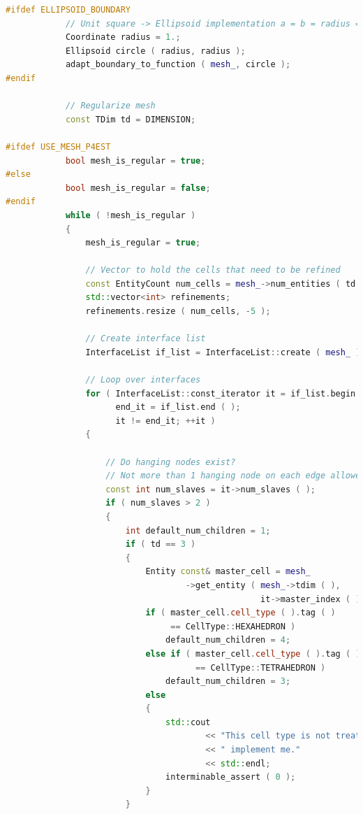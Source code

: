 \documentclass[a4paper, 11pt, twoside]{article}
\begin{document}
\begin{lstlisting}[language=C++, basicstyle={\footnotesize, \ttfamily}, keywordstyle=\color{blue}, numbers=none, tabsize=4]
#ifdef ELLIPSOID_BOUNDARY
            // Unit square -> Ellipsoid implementation a = b = radius = 1.
            Coordinate radius = 1.;
            Ellipsoid circle ( radius, radius );
            adapt_boundary_to_function ( mesh_, circle );
#endif

            // Regularize mesh
            const TDim td = DIMENSION;

#ifdef USE_MESH_P4EST
            bool mesh_is_regular = true;
#else
            bool mesh_is_regular = false;
#endif
            while ( !mesh_is_regular )
            {
                mesh_is_regular = true;

                // Vector to hold the cells that need to be refined
                const EntityCount num_cells = mesh_->num_entities ( td );
                std::vector<int> refinements;
                refinements.resize ( num_cells, -5 );

                // Create interface list
                InterfaceList if_list = InterfaceList::create ( mesh_ );

                // Loop over interfaces
                for ( InterfaceList::const_iterator it = if_list.begin ( ),
                      end_it = if_list.end ( );
                      it != end_it; ++it )
                {

                    // Do hanging nodes exist?
                    // Not more than 1 hanging node on each edge allowed.
                    const int num_slaves = it->num_slaves ( );
                    if ( num_slaves > 2 )
                    {
                        int default_num_children = 1;
                        if ( td == 3 )
                        {
                            Entity const& master_cell = mesh_
                                    ->get_entity ( mesh_->tdim ( ),
                                                   it->master_index ( ) );
                            if ( master_cell.cell_type ( ).tag ( )
                                 == CellType::HEXAHEDRON )
                                default_num_children = 4;
                            else if ( master_cell.cell_type ( ).tag ( )
                                      == CellType::TETRAHEDRON )
                                default_num_children = 3;
                            else
                            {
                                std::cout
                                        << "This cell type is not treated ..."
                                        << " implement me."
                                        << std::endl;
                                interminable_assert ( 0 );
                            }
                        }


\end{lstlisting}
\end{document}
